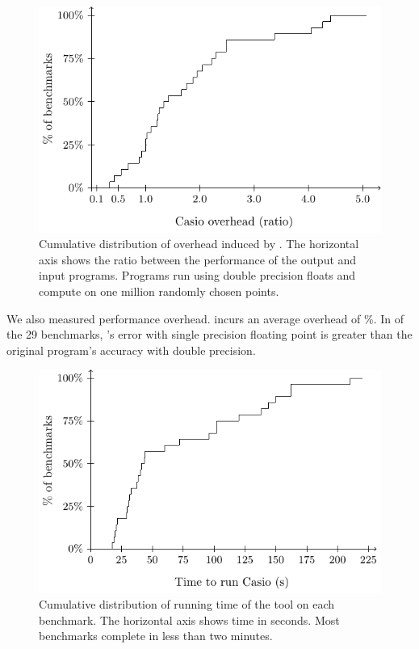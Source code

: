 \documentclass[paper.tex]{subfiles}
\begin{document}
\begin{figure}
  \centering
  \includegraphics[width=0.9\columnwidth]{fig/eval-overhead-d.pdf}
  \caption{Cumulative distribution of overhead induced by \casio. The
    horizontal axis shows the ratio between the performance of the
    output and input programs. Programs run using double precision
    floats and compute on one million randomly chosen points.}
  \label{fig:eval-overhead}
\end{figure}

 We also measured performance overhead. \casio incurs
an average overhead of \%.  In  of the 29 benchmarks,
\casio's error with single precision floating point is greater than
the original program's accuracy with double precision.

\begin{figure}
\includegraphics[width=0.9\columnwidth]{fig/eval-casio-time.pdf}
\caption{Cumulative distribution of running time of the \casio tool on
  each benchmark. The horizontal axis shows time in seconds. Most
  benchmarks complete in less than two minutes.}
\label{fig:eval-casio-time}
\end{figure}
\end{document}
